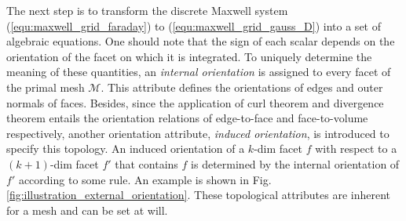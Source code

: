 \documentclass{article}
\begin{document}
The next step is to transform the discrete Maxwell system (\ref{equ:maxwell_grid_faraday}) to (\ref{equ:maxwell_grid_gauss_D}) into a set of algebraic equations. One should note that the sign of each scalar depends on the orientation of the facet on which it is integrated. To uniquely determine the meaning of these quantities, an \emph{internal orientation} is assigned to every facet of the primal mesh $\mathcal{M}$. This attribute defines the orientations of edges and outer normals of faces. Besides, since the application of curl theorem and divergence theorem entails the orientation relations of edge-to-face and face-to-volume respectively, another orientation attribute, \emph{induced orientation}, is introduced to specify this topology. An induced orientation of a $k$-dim facet $f$ with respect to a $(k+1)$-dim facet $f'$ that contains $f$ is determined by the internal orientation of $f'$ according to some rule. An example is shown in Fig. \ref{fig:illustration_external_orientation}.
These topological attributes are inherent for a mesh and can be set at will.
\end{document}
